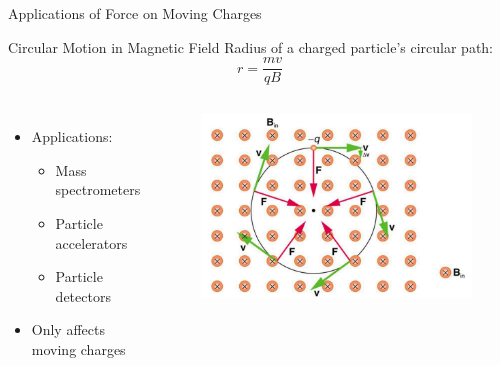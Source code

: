 \documentclass{beamer}
\begin{document}
\begin{frame}{Applications of Force on Moving Charges}
\begin{block}{Circular Motion in Magnetic Field}
Radius of a charged particle's circular path:
\begin{equation}
r = \frac{mv}{qB}
\end{equation}
\end{block}

\begin{columns}
\begin{itemize}
\item Applications:
\begin{itemize}
\item Mass spectrometers
\item Particle accelerators
\item Particle detectors
\end{itemize}
\item Only affects moving charges
\end{itemize}

\begin{figure}
\centering
\includegraphics[width=1\linewidth]{mggmgcrc.png}
\end{figure}
\end{columns}
\end{frame}
\end{document}
